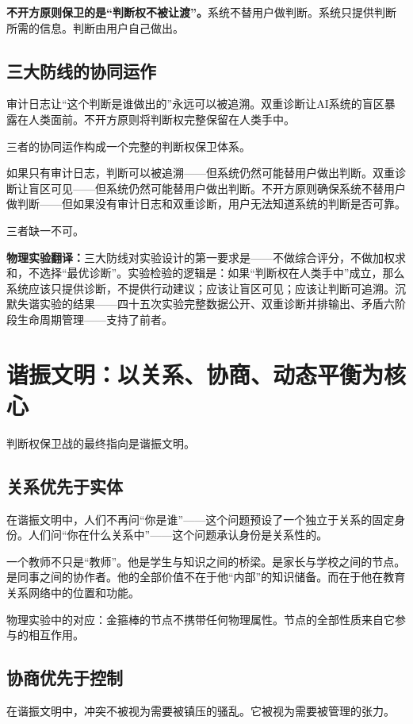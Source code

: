 \documentclass[11pt,a4paper]{book}
\theoremstyle{definition}
\begin{document}
\textbf{不开方原则保卫的是“判断权不被让渡”。}系统不替用户做判断。系统只提供判断所需的信息。判断由用户自己做出。

\subsection{三大防线的协同运作}

审计日志让“这个判断是谁做出的”永远可以被追溯。双重诊断让AI系统的盲区暴露在人类面前。不开方原则将判断权完整保留在人类手中。

三者的协同运作构成一个完整的判断权保卫体系。

如果只有审计日志，判断可以被追溯——但系统仍然可能替用户做出判断。双重诊断让盲区可见——但系统仍然可能替用户做出判断。不开方原则确保系统不替用户做判断——但如果没有审计日志和双重诊断，用户无法知道系统的判断是否可靠。

三者缺一不可。

\textbf{物理实验翻译：}三大防线对实验设计的第一要求是——不做综合评分，不做加权求和，不选择“最优诊断”。实验检验的逻辑是：如果“判断权在人类手中”成立，那么系统应该只提供诊断，不提供行动建议；应该让盲区可见；应该让判断可追溯。沉默失谐实验的结果——四十五次实验完整数据公开、双重诊断并排输出、矛盾六阶段生命周期管理——支持了前者。

\section{谐振文明：以关系、协商、动态平衡为核心}

判断权保卫战的最终指向是谐振文明。

\subsection{关系优先于实体}

在谐振文明中，人们不再问“你是谁”——这个问题预设了一个独立于关系的固定身份。人们问“你在什么关系中”——这个问题承认身份是关系性的。

一个教师不只是“教师”。他是学生与知识之间的桥梁。是家长与学校之间的节点。是同事之间的协作者。他的全部价值不在于他“内部”的知识储备。而在于他在教育关系网络中的位置和功能。

物理实验中的对应：金箍棒的节点不携带任何物理属性。节点的全部性质来自它参与的相互作用。

\subsection{协商优先于控制}

在谐振文明中，冲突不被视为需要被镇压的骚乱。它被视为需要被管理的张力。
\end{document}
